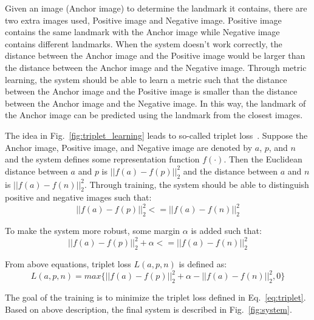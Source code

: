 \documentclass[final,3p]{elsarticle}
\begin{document}
Given an image (Anchor image) to determine the landmark it contains, there are two extra images used,  Positive image and Negative image. Positive image contains the same landmark with the Anchor image while Negative image contains different landmarks. When the system doesn't work correctly, the distance between the Anchor image and the Positive image would be larger than the distance between the Anchor image and the Negative image. Through metric learning, the system should be able to learn a metric such that the distance between the Anchor image and the Positive image is smaller than the distance between the Anchor image and the Negative image. In this way, the landmark of the Anchor image can be predicted using the landmark from the closest images.

The idea in Fig.~\ref{fig:triplet_learning} leads to so-called triplet loss~\cite{schroff2015facenet}. Suppose the Anchor image, Positive image, and Negative image are denoted by $a$, $p$, and $n$ and the system defines some representation function $f(\cdot)$. Then the Euclidean distance between $a$ and $p$ is $||f(a) - f(p)||^2_2$ and the distance between $a$ and $n$ is $||f(a) - f(n)||^2_2$. Through training, the system should be able to distinguish positive and negative images such that:
\begin{equation}
||f(a) - f(p)||^2_2 <= ||f(a) - f(n)||^2_2
\end{equation}

To make the system more robust, some margin $\alpha$ is added such that:
\begin{equation}
||f(a) - f(p)||^2_2 + \alpha <= ||f(a) - f(n)||^2_2
\end{equation}

From above equations, triplet loss $L(a, p, n)$ is defined as:
\begin{equation}
L(a, p, n) = max\{||f(a) - f(p)||^2_2 + \alpha - ||f(a) - f(n)||^2_2, 0\}
\label{eq:triplet}
\end{equation}

The goal of the training is to minimize the triplet loss defined in Eq.~\ref{eq:triplet}. Based on above description, the final system is described in Fig.~\ref{fig:system}.
\end{document}

